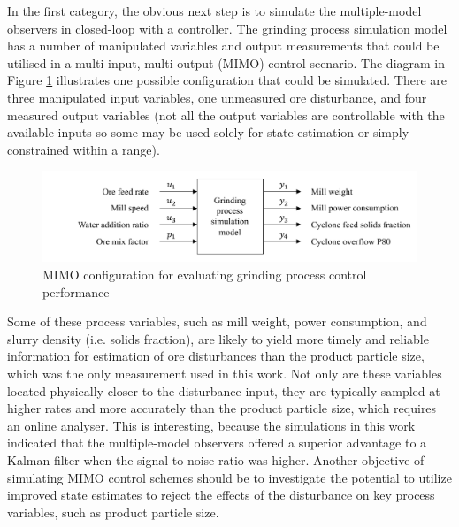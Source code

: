 In the first category, the obvious next step is to simulate the multiple-model observers in closed-loop with a controller. The grinding process simulation model has a number of manipulated variables and output measurements that could be utilised in a multi-input, multi-output (\gls{MIMO}) control scenario. The diagram in Figure \ref{fig:grind_sim_io_diag} illustrates one possible configuration that could be simulated. There are three manipulated input variables, one unmeasured ore disturbance, and four measured output variables (not all the output variables are controllable with the available inputs so some may be used solely for state estimation or simply constrained within a range).
\begin{figure}[ht]
	\centering
	\includegraphics[width=15cm]{images/grind_sim_io_diag.pdf}
	\caption{\acrshort{MIMO} configuration for evaluating grinding process control performance}
	\label{fig:grind_sim_io_diag}
\end{figure}
Some of these process variables, such as mill weight, power consumption, and slurry density (i.e. solids fraction), are likely to yield more timely and reliable information for estimation of ore disturbances than the product particle size, which was the only measurement used in this work. Not only are these variables located physically closer to the disturbance input, they are typically sampled at higher rates and more accurately than the product particle size, which requires an online analyser. This is interesting, because the simulations in this work indicated that the multiple-model observers offered a superior advantage to a Kalman filter when the signal-to-noise ratio was higher. Another objective of simulating \gls{MIMO} control schemes should be to investigate the potential to utilize improved state estimates to reject the effects of the disturbance on key process variables, such as product particle size.


